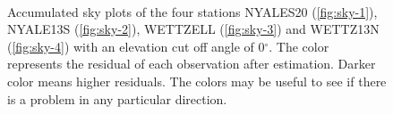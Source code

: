 \documentclass[twoside=semi,fontsize=12pt,paper=a4,titlepage=on]{kv_article}
\begin{document}
\begin{figure}
	 \\
    \caption{Accumulated sky plots of the four stations NYALES20 (\ref{fig:sky-1}), NYALE13S (\ref{fig:sky-2}), WETTZELL (\ref{fig:sky-3}) and WETTZ13N (\ref{fig:sky-4}) with an elevation cut off angle of 0$^\circ$. The color represents the residual of each observation after estimation. Darker color means higher residuals. The colors may be useful to see if there is a problem in any particular direction.}
	\label{fig:sky}
\end{figure}
\end{document}
